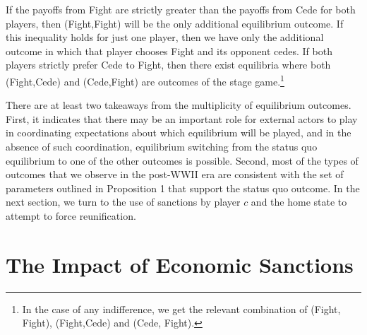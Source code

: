 \documentclass[11pt,letterpaper, notitlepage]{article}
\begin{document}
If the payoffs from Fight are strictly greater than the payoffs from Cede for both players, then (Fight,Fight) will be the only additional equilibrium outcome. If this inequality holds for just one player, then we have only the additional outcome in which that player chooses Fight and its opponent cedes. If both players strictly prefer Cede to Fight, then there exist equilibria where both (Fight,Cede) and (Cede,Fight) are outcomes of the stage game.\footnote{In the case of any indifference, we get the relevant combination of (Fight, Fight), (Fight,Cede) and (Cede, Fight).}

There are at least two takeaways from the multiplicity of equilibrium outcomes. First, it indicates that there may be an important role for external actors to play in coordinating expectations about which equilibrium will be played, and in the absence of such coordination, equilibrium switching from the status quo equilibrium to one of the other outcomes is possible. Second, most of the types of outcomes that we observe in the post-WWII era are consistent with the set of parameters outlined in Proposition 1 that support the status quo outcome. In the next section, we turn to the use of sanctions by player $c$ and the home state to attempt to force reunification.

\section{The Impact of Economic Sanctions}
\label{sec:sanctions}

\end{document}
